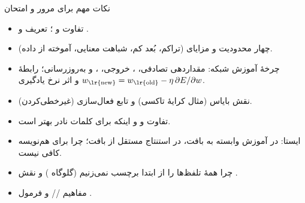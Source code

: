 \begin{exambox}{نکات مهم برای مرور و امتحان}
\begin{itemize}
  \item تفاوت  و ؛ تعریف  و .
  \item چهار محدودیت  و مزایای  (تراکم، بُعد کم، شباهت معنایی، آموخته از داده).
  \item چرخهٔ آموزش شبکه: مقداردهی تصادفی، ، خروجی، ،  و به‌روزرسانی؛ رابطهٔ $w_{\text{\lr{new}}}=w_{\text{\lr{old}}}-\eta\,\partial E/\partial w$ و اثر نرخ یادگیری.
  \item نقش بایاس (مثال کرایهٔ تاکسی) و تابع فعال‌سازی (غیرخطی‌کردن).
  \item تفاوت  و  و اینکه برای کلمات نادر  بهتر است.
  \item {} ایستا: در آموزش وابسته به بافت، در استنتاج مستقل از بافت؛ چرا برای هم‌نویسه کافی نیست.
  \item چرا همهٔ تلفظ‌ها را از ابتدا برچسب نمی‌زنیم (گلوگاه ) و نقش .
  \item مفاهیم // و فرمول .
\end{itemize}
\end{exambox}
